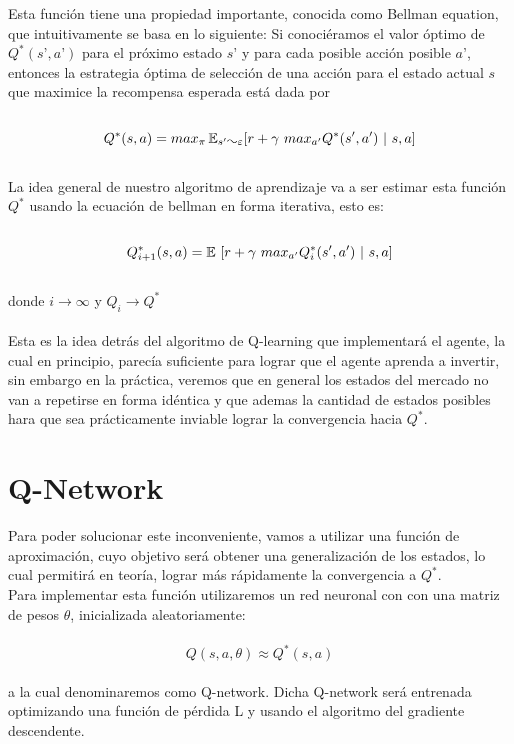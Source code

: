 Esta función tiene una propiedad importante, conocida como Bellman equation, que intuitivamente se basa en lo siguiente: 
Si conociéramos el valor óptimo de $Q^*(s’, a’)$ para el próximo estado $s’$ y para cada posible acción posible $a’$, entonces la estrategia óptima de selección de una acción para el estado actual $s$ que maximice la recompensa esperada está dada por
\\\\
\begin{equation}
Q^*(s, a) = max_{\pi} \E_{s' \AC \varepsilon} [ r + \gamma \  max_{a'} Q^*(s', a') \  |  \ s, a]
\end{equation}
\\
La idea general de nuestro algoritmo de aprendizaje va a ser estimar esta función $Q^*$ usando la ecuación de bellman en forma iterativa, esto es:
\\\\
\begin{equation}
Q^*_{i+1}(s, a) = \operatorname{\mathbb{E}}\ [ r + \gamma \  max_{a'} Q_{i}^*(s', a') \  |  \ s, a]
\end{equation}
\\
donde  $i\rightarrow\infty$ y $Q_i \rightarrow Q^*$
\\\\
Esta es la idea detrás del algoritmo de Q-learning que implementará el agente, la cual en principio, parecía suficiente para lograr que el agente aprenda a invertir, sin embargo en la práctica, veremos que en general los estados del mercado no van a repetirse en forma idéntica y que ademas la cantidad de estados posibles hara que sea prácticamente inviable lograr la convergencia hacia $Q^*$.

\section{Q-Network}
Para poder solucionar este inconveniente, vamos a utilizar una función de aproximación, cuyo objetivo será obtener una generalización de los estados, lo cual permitirá en teoría, lograr más rápidamente la convergencia a $Q^*$.\\
Para implementar esta función utilizaremos un red neuronal con con una matriz de pesos $\theta$, inicializada aleatoriamente: 
\\\\
\begin{equation}
Q(s, a, \theta) \approx Q^*(s, a) 
\end{equation}
\\
a la cual denominaremos como Q-network.
Dicha Q-network será entrenada optimizando una función de pérdida L y usando el algoritmo del gradiente descendente.
\\

